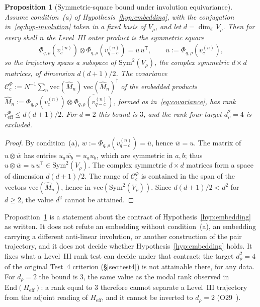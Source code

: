 \documentclass[12pt,a4paper]{article}
\newtheorem{proposition}[theorem]{Proposition}
\theoremstyle{definition}
\theoremstyle{remark}
\begin{document}
    \begin{proposition}[Symmetric-square bound under involution equivariance]
      \label{prop:sym-bound}
      Assume condition~(a) of Hypothesis~\ref{hyp:embedding}, with the conjugation
      in~\eqref{eq:hyp-involution} taken in a fixed basis of $V_\rho$, and let
      $d = \dim_{\mathbb{C}} V_\rho$.
      Then for every shell $n$ the Level~III outer product is the symmetric square
      \[
        \Phi_{q,\rho}(v_c^{(n)}) \otimes \overline{\Phi_{q,\rho}(v_{q-c}^{(n)})} = u\,u^{\mathsf T},
        \qquad u := \Phi_{q,\rho}(v_c^{(n)}),
      \]
      so the trajectory spans a subspace of $\mathrm{Sym}^2(V_\rho)$, the complex symmetric
      $d \times d$ matrices, of dimension $d(d+1)/2$.
      The covariance
      $\mathcal{C}^{\Phi}_c := N^{-1}\sum_n \mathrm{vec}(\widehat{M}_n)\,\mathrm{vec}(\widehat{M}_n)^\dagger$
      of the embedded products
      $\widehat{M}_n := \Phi_{q,\rho}(v_c^{(n)}) \otimes \overline{\Phi_{q,\rho}(v_{q-c}^{(n)})}$,
      formed as in~\eqref{eq:covariance}, has rank $r^{\Phi}_{\mathrm{eff}} \leq d(d+1)/2$.
      For $d = 2$ this bound is $3$, and the rank-four target $d_\rho^2 = 4$ is excluded.
    \end{proposition}

    \begin{proof}
      By condition~(a), $w := \Phi_{q,\rho}(v_{q-c}^{(n)}) = \overline{u}$, hence $\overline{w} = u$.
      The matrix of $u \otimes \overline{w}$ has entries $u_a \overline{w_b} = u_a u_b$, which are
      symmetric in $a, b$; thus $u \otimes \overline{w} = u\,u^{\mathsf T} \in \mathrm{Sym}^2(V_\rho)$.
      The complex symmetric $d \times d$ matrices form a space of dimension $d(d+1)/2$.
      The range of $\mathcal{C}^{\Phi}_c$ is contained in the span of the vectors
      $\mathrm{vec}(\widehat{M}_n)$, hence in $\mathrm{vec}(\mathrm{Sym}^2(V_\rho))$.
      Since $d(d+1)/2 < d^2$ for $d \geq 2$, the value $d^2$ cannot be attained.
    \end{proof}

    Proposition~\ref{prop:sym-bound} is a statement about the contract of
    Hypothesis~\ref{hyp:embedding} as written.
    It does not refute an embedding without condition~(a), an embedding carrying a different
    anti-linear involution, or another construction of the pair trajectory, and it does not
    decide whether Hypothesis~\ref{hyp:embedding} holds.
    It fixes what a Level~III rank test can decide under that contract: the target $d_\rho^2 = 4$
    of the original Test~4 criterion (§\ref{sec:test4}) is not attainable there, for any data.
    For $d_\rho = 2$ the bound is $3$, the same value as the modal rank observed in
    $\mathrm{End}(H_{\mathrm{eff}})$: a rank equal to $3$ therefore cannot separate a Level~III trajectory
    from the adjoint reading of $H_{\mathrm{eff}}$, and it cannot be inverted to $d_\rho = 2$
    (O29~\cite{Beau2026a33}).
\end{document}

